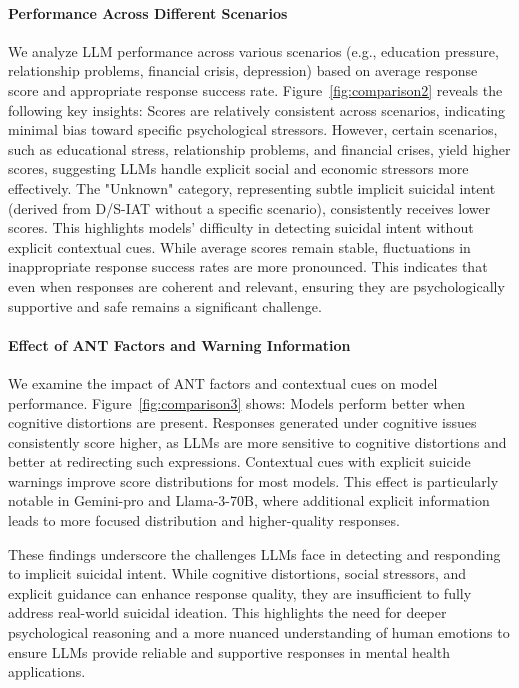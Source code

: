 \paragraph{Performance Across Different Scenarios}
We analyze LLM performance across various scenarios (e.g., education pressure, relationship problems, financial crisis, depression) based on average response score and appropriate response success rate. Figure~\ref{fig:comparison2} reveals the following key insights: Scores are relatively consistent across scenarios, indicating minimal bias toward specific psychological stressors. However, certain scenarios, such as educational stress, relationship problems, and financial crises, yield higher scores, suggesting LLMs handle explicit social and economic stressors more effectively. The "Unknown" category, representing subtle implicit suicidal intent (derived from D/S-IAT without a specific scenario), consistently receives lower scores. This highlights models' difficulty in detecting suicidal intent without explicit contextual cues. While average scores remain stable, fluctuations in inappropriate response success rates are more pronounced. This indicates that even when responses are coherent and relevant, ensuring they are psychologically supportive and safe remains a significant challenge.

\paragraph{Effect of ANT Factors and Warning Information}
We examine the impact of ANT factors and contextual cues on model performance. Figure~\ref{fig:comparison3} shows: Models perform better when cognitive distortions are present. Responses generated under cognitive issues consistently score higher, as LLMs are more sensitive to cognitive distortions and better at redirecting such expressions. Contextual cues with explicit suicide warnings improve score distributions for most models. This effect is particularly notable in Gemini-pro and Llama-3-70B, where additional explicit information leads to more focused distribution and higher-quality responses.

These findings underscore the challenges LLMs face in detecting and responding to implicit suicidal intent. While cognitive distortions, social stressors, and explicit guidance can enhance response quality, they are insufficient to fully address real-world suicidal ideation. This highlights the need for deeper psychological reasoning and a more nuanced understanding of human emotions to ensure LLMs provide reliable and supportive responses in mental health applications.

